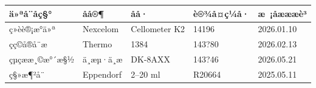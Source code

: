 \documentclass[UTF8,10pt,a4paper,fontset=fandol]{ctexart}
\newcommand{\fieldvalue}[1]{#1}
\newcommand{\handwritten}[1]{#1}
\begin{document}
\begin{tabularx}{\textwidth}{|l|X|X|X|X|}
\hline
ä»ªå¨åç§° & åå®¶ & åå· & è®¾å¤ç¼å· & æ ¡åæææè³\\
\hline
ç»èè®¡æ°ä»ª &
\fieldvalue{Nexcelom} &
\fieldvalue{Cellometer K2} &
\fieldvalue{\handwritten{14196}} &
\fieldvalue{\handwritten{2026.01.10}}\\
\hline
çç©å®å¨æ &
\fieldvalue{Thermo} &
\fieldvalue{\handwritten{1384}} &
\fieldvalue{\handwritten{143?80}} &
\fieldvalue{\handwritten{2026.02.13}}\\
\hline
çµç­ææ¸©æ°´æ§½ &
\fieldvalue{ä¸æµ·ä¸æ} &
\fieldvalue{\handwritten{DK-8AXX}} &
\fieldvalue{\handwritten{143?46}} &
\fieldvalue{\handwritten{2026.05.21}}\\
\hline
ç§»æ¶²å¨ &
\fieldvalue{Eppendorf} &
\fieldvalue{\handwritten{2--20 ml}} &
\fieldvalue{\handwritten{R20664}} &
\fieldvalue{\handwritten{2025.05.11}}\\
\hline
\end{tabularx}
\end{document}
